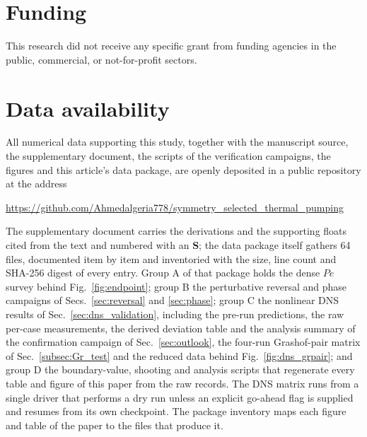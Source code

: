 \documentclass[12pt,a4paper]{article}
\newcommand{\Pe}{\mathit{Pe}}
\begin{document}
\section*{Funding}
This research did not receive any specific grant from funding agencies in the
public, commercial, or not-for-profit sectors.

\section*{Data availability}
All numerical data supporting this study, together with the manuscript source, the
supplementary document, the
scripts of the verification campaigns, the figures and this article's data package, are
openly deposited in a public repository at the address
\medskip

\noindent\mbox{\footnotesize\url{https://github.com/Ahmedalgeria778/symmetry_selected_thermal_pumping}}
\medskip

\noindent The
supplementary document carries the derivations and the supporting floats cited from the
text and numbered with an \textbf{S}; the data package itself gathers
64 files, documented item by item and inventoried with the size, line count and SHA-256
digest of every entry. Group A of that package holds the dense $\Pe$ survey behind
Fig.~\ref{fig:endpoint}; group B the perturbative reversal and phase campaigns of
Secs.~\ref{sec:reversal} and \ref{sec:phase}; group C the nonlinear DNS results of
Sec.~\ref{sec:dns_validation}, including the pre-run predictions, the raw per-case
measurements, the derived deviation table and the analysis summary of the confirmation
campaign of Sec.~\ref{sec:outlook}, the four-run Grashof-pair matrix of
Sec.~\ref{subsec:Gr_test} and the reduced data behind Fig.~\ref{fig:dns_grpair}; and group D
the boundary-value, shooting and analysis scripts that regenerate every table and figure
of this paper from the raw records. The DNS matrix runs from a single driver that
performs a dry run unless an explicit go-ahead flag is supplied and resumes from its own
checkpoint. The package inventory maps each figure and table of the paper to the files
that produce it.


\end{document}
